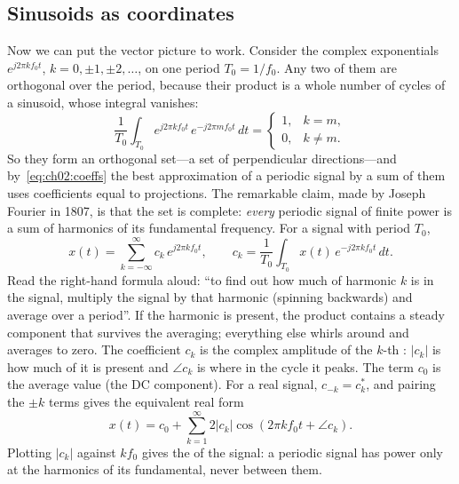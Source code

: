 
\subsection{Sinusoids as coordinates}

Now we can put the vector picture to work. Consider the complex exponentials $e^{j2\pi kf_0t}$,
$k=0,\pm1,\pm2,\dots$, on one period $T_0=1/f_0$. Any two of them are orthogonal over the period,
because their product is a whole number of cycles of a sinusoid, whose integral vanishes:
\begin{equation}
\frac{1}{T_0}\int_{T_0}e^{j2\pi kf_0t}\,e^{-j2\pi mf_0t}\,dt=
\begin{cases}1,&k=m,\\0,&k\ne m.\end{cases}
\end{equation}
So they form an orthogonal set---a set of perpendicular directions---and
by~\eqref{eq:ch02:coeffs} the best approximation of a periodic signal by a sum of them uses
coefficients equal to projections. The remarkable claim, made by Joseph Fourier in 1807, is that the
set is complete: \emph{every} periodic signal of finite power is a sum of harmonics of its
fundamental frequency. For a signal with period $T_0$,
\begin{equation}
x(t)=\sum_{k=-\infty}^{\infty}c_k\,e^{j2\pi k f_0 t},
\qquad c_k=\frac{1}{T_0}\int_{T_0}x(t)\,e^{-j2\pi k f_0 t}\,dt .
\label{eq:ch02:fs}
\end{equation}
Read the right-hand formula aloud: ``to find out how much of harmonic $k$ is in the signal, multiply
the signal by that harmonic (spinning backwards) and average over a period''. If the harmonic is
present, the product contains a steady component that survives the averaging; everything else
whirls around and averages to zero. The coefficient $c_k$ is the complex amplitude of the $k$-th
: $|c_k|$ is how much of it is present and $\angle c_k$ is where in the cycle it peaks.
The term $c_0$ is the average value (the DC component). For a real signal, $c_{-k}=c_k^*$, and
pairing the $\pm k$ terms gives the equivalent real form
\begin{equation}
x(t)=c_0+\sum_{k=1}^{\infty}2|c_k|\cos(2\pi kf_0t+\angle c_k).
\label{eq:ch02:fsreal}
\end{equation}
Plotting $|c_k|$ against $kf_0$ gives the  of the signal: a periodic signal
has power only at the harmonics of its fundamental, never between them.


